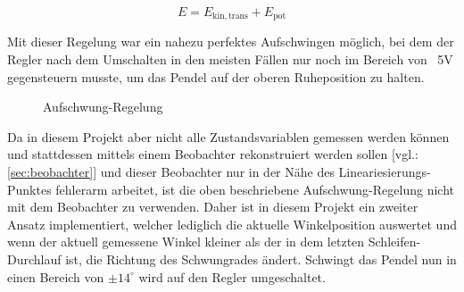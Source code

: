 \begin{equation} \label{eq:Gleichung6.2}
    E = E_{\mathrm{kin,trans}} + E_{\mathrm{pot}}
\end{equation}
\newline

Mit dieser Regelung war ein nahezu perfektes Aufschwingen möglich, bei dem der Regler nach dem Umschalten in den meisten Fällen nur noch im Bereich von ~5V gegensteuern musste, um das Pendel auf der oberen Ruheposition zu halten.

\begin{figure}[H]
   \centering
   \caption[Aufschwung-Regelung]{Aufschwung-Regelung}
   \label{fig:Bild6.2}
\end{figure}

Da in diesem Projekt aber nicht alle Zustandsvariablen gemessen werden können und stattdessen mittels einem Beobachter rekonstruiert werden sollen [vgl.: \autoref{sec:beobachter}] und dieser Beobachter nur in der Nähe des Lineariesierungs-Punktes fehlerarm arbeitet, ist die oben beschriebene Aufschwung-Regelung nicht mit dem Beobachter zu verwenden.
Daher ist in diesem Projekt ein zweiter Ansatz implementiert, welcher lediglich die aktuelle Winkelposition auswertet und wenn der aktuell gemessene Winkel kleiner als der in dem letzten Schleifen-Durchlauf ist, die Richtung des Schwungrades ändert. Schwingt das Pendel nun in einen Bereich von $\pm 14^\circ$ wird auf den Regler umgeschaltet.

